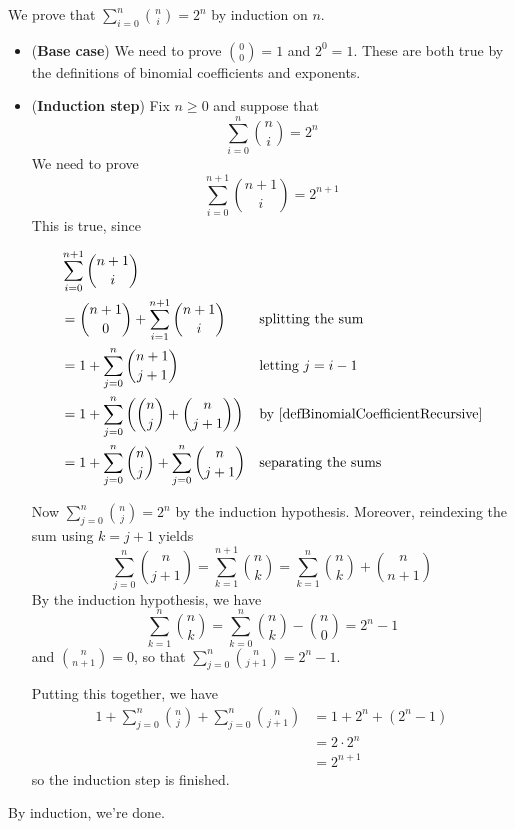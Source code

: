 \begin{example}
\label{exSumOfBinomialCoefficients}
We prove that $\sum_{i=0}^n \binom{n}{i} = 2^n$ by induction on $n$.
\begin{itemize}
\item (\textbf{Base case}) We need to prove $\binom{0}{0} = 1$ and $2^0=1$. These are both true by the definitions of binomial coefficients and exponents.
\item (\textbf{Induction step}) Fix $n \ge 0$ and suppose that
\[ \sum_{i=0}^n \binom{n}{i} = 2^n \]
We need to prove
\[ \sum_{i=0}^{n+1} \binom{n+1}{i} = 2^{n+1} \]
This is true, since

\begin{align*}
&\sum_{i=0}^{n+1} \binom{n+1}{i} && \\
&= \binom{n+1}{0} + \sum_{i=1}^{n+1} \binom{n+1}{i} && \text{splitting the sum} \\
&= 1 + \sum_{j=0}^n \binom{n+1}{j+1} && \text{letting $j=i-1$} \\
&= 1 + \sum_{j=0}^n \left(\binom{n}{j} + \binom{n}{j+1}\right) && \text{by \Cref{defBinomialCoefficientRecursive}} \\
&= 1 + \sum_{j=0}^n \binom{n}{j} + \sum_{j=0}^n \binom{n}{j+1} && \text{separating the sums}
\end{align*}

Now $\sum_{j=0}^n \binom{n}{j} = 2^n$ by the induction hypothesis. Moreover, reindexing the sum using $k=j+1$ yields
\[ \sum_{j=0}^n \binom{n}{j+1} = \sum_{k=1}^{n+1} \binom{n}{k} = \sum_{k=1}^n \binom{n}{k} + \binom{n}{n+1} \]
By the induction hypothesis, we have
\[ \sum_{k=1}^n \binom{n}{k} = \sum_{k=0}^n \binom{n}{k} - \binom{n}{0} = 2^n-1 \]
and $\binom{n}{n+1} = 0$, so that $\sum_{j=0}^n \binom{n}{j+1} = 2^n-1$.

Putting this together, we have
\begin{align*}
1 + \sum_{j=0}^n \binom{n}{j} + \sum_{j=0}^n \binom{n}{j+1}
&= 1 + 2^n + (2^n-1) \\
&= 2 \cdot 2^n \\
&= 2^{n+1}
\end{align*}
so the induction step is finished.
\end{itemize}
By induction, we're done.
\end{example}

